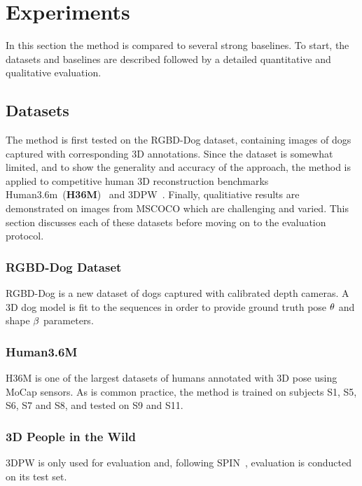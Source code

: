 \section{Experiments}\label{s:exp}

In this section the method is compared to several strong baselines.
To start, the datasets and baselines are described followed by a detailed quantitative and qualitative evaluation.





\subsection{Datasets}

The method is first tested on the RGBD-Dog dataset, containing images of dogs captured with corresponding 3D annotations. Since the dataset is somewhat limited, and to show the generality and accuracy of the approach, the method is applied to competitive human 3D reconstruction benchmarks Human3.6m~(\textbf{H36M})~\cite{ionescu2013human3,IonescuSminchisescu11} and 3DPW~\cite{vonmarcard2018recovering}. Finally, qualitiative results are demonstrated on images from MSCOCO which are challenging and varied. This section discusses each of these datasets before moving on to the evaluation protocol. 

\subsubsection{RGBD-Dog Dataset}

RGBD-Dog is a new dataset of dogs captured with calibrated depth cameras. A 3D dog model is fit to the sequences in order to provide ground truth pose $\theta$ and shape $\beta$ parameters. 

\subsubsection{Human3.6M}

H36M is one of the largest datasets of humans annotated with 3D pose using MoCap sensors. As is common practice, the method is trained on subjects S1, S5, S6, S7 and S8, and tested on S9 and S11. 

\subsubsection{3D People in the Wild}
3DPW is only used for evaluation and, following SPIN~\cite{kolotouros19convolutional}, evaluation is conducted on its test set.


